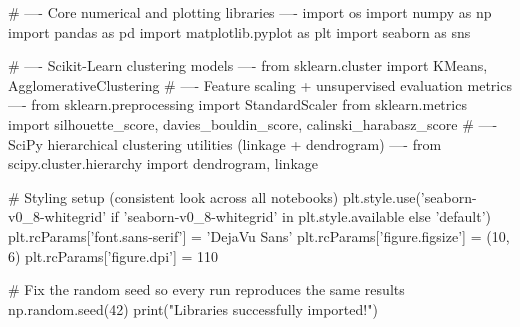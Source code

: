 
\begin{codebox}[title={Listing 1.1 Imports and plotting style}]
# ---- Core numerical and plotting libraries ----
import os
import numpy as np
import pandas as pd
import matplotlib.pyplot as plt
import seaborn as sns


# ---- Scikit-Learn clustering models ----
from sklearn.cluster import KMeans, AgglomerativeClustering
# ---- Feature scaling + unsupervised evaluation metrics ----
from sklearn.preprocessing import StandardScaler
from sklearn.metrics import silhouette_score, davies_bouldin_score, calinski_harabasz_score
# ---- SciPy hierarchical clustering utilities (linkage + dendrogram) ----
from scipy.cluster.hierarchy import dendrogram, linkage

# Styling setup (consistent look across all notebooks)
plt.style.use('seaborn-v0_8-whitegrid' if 'seaborn-v0_8-whitegrid' in plt.style.available else 'default')
plt.rcParams['font.sans-serif'] = 'DejaVu Sans'
plt.rcParams['figure.figsize'] = (10, 6)
plt.rcParams['figure.dpi'] = 110

# Fix the random seed so every run reproduces the same results
np.random.seed(42)
print("Libraries successfully imported!")
\end{codebox}


